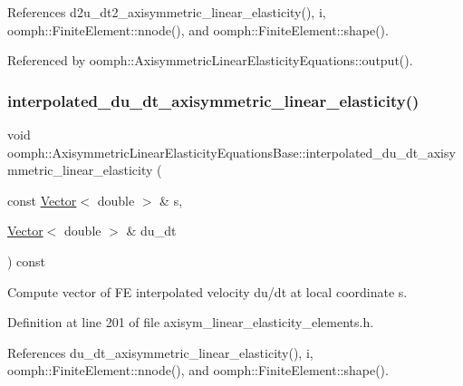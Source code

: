 References d2u\+\_\+dt2\+\_\+axisymmetric\+\_\+linear\+\_\+elasticity(), i, oomph\+::\+Finite\+Element\+::nnode(), and oomph\+::\+Finite\+Element\+::shape().



Referenced by oomph\+::\+Axisymmetric\+Linear\+Elasticity\+Equations\+::output().

\mbox{\label{classoomph_1_1AxisymmetricLinearElasticityEquationsBase_a9b517ddf75cc1a62fbce45d8333cbcaa}} 
\subsubsection{\texorpdfstring{interpolated\+\_\+du\+\_\+dt\+\_\+axisymmetric\+\_\+linear\+\_\+elasticity()}{interpolated\_du\_dt\_axisymmetric\_linear\_elasticity()}}
{\footnotesize\ttfamily void oomph\+::\+Axisymmetric\+Linear\+Elasticity\+Equations\+Base\+::interpolated\+\_\+du\+\_\+dt\+\_\+axisymmetric\+\_\+linear\+\_\+elasticity (\begin{DoxyParamCaption}\item[{const \hyperlink{classoomph_1_1Vector}{Vector}$<$ double $>$ \&}]{s,  }\item[{\hyperlink{classoomph_1_1Vector}{Vector}$<$ double $>$ \&}]{du\+\_\+dt }\end{DoxyParamCaption}) const\hspace{0.3cm}{\ttfamily [inline]}}



Compute vector of FE interpolated velocity du/dt at local coordinate s. 



Definition at line 201 of file axisym\+\_\+linear\+\_\+elasticity\+\_\+elements.\+h.



References du\+\_\+dt\+\_\+axisymmetric\+\_\+linear\+\_\+elasticity(), i, oomph\+::\+Finite\+Element\+::nnode(), and oomph\+::\+Finite\+Element\+::shape().



